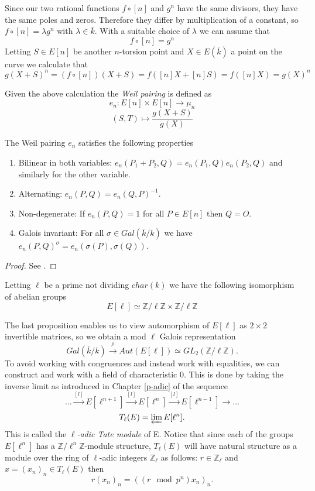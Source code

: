 Since our two rational functions $f \circ [n]$ and $g^n$ have the same divisors, they have the
same poles and zeros. Therefore they differ by multiplication of a constant, so
$f \circ [n] = \lambda g^n$ with $\lambda \in \bar{k}$. With a suitable choice of $\lambda$
we can assume that 
$$f \circ [n] = g^n$$
Letting $S \in E[n]$ be another $n$-torsion point and $X \in E(\bar{k})$ a point on the curve we calculate that
$$ g(X + S)^n = (f \circ [n])(X + S) = f([n]X + [n]S) = f([n]X) = g(X)^n $$
\begin{mydef}
 Given the above calculation the \emph{Weil pairing} is defined as
$$ e_n : E[n] \times E[n] \rightarrow \mu_n$$
$$ (S,T) \mapsto \frac{g(X + S)}{g(X)} $$
\end{mydef}

\begin{prop}
 The Weil pairing $e_n$ satisfies the following properties
\begin{enumerate}
 \item Bilinear in both variables: $e_n(P_1 + P_2, Q) = e_n(P_1,Q)e_n(P_2,Q)$ and similarly for the other variable.
 \item Alternating: $e_n(P,Q) = e_n(Q,P)^{-1}$.
 \item Non-degenerate: If $e_n(P,Q) = 1$ for all $P \in E[n]$ then $Q=O$.
 \item Galois invariant: For all $\sigma \in Gal(\bar{k}/k)$ we have $e_n(P,Q)^\sigma = e_n(\sigma(P),\sigma(Q))$.
\end{enumerate}
\end{prop}
\begin{proof}
 See \cite{AEC}.
\end{proof}

\begin{prop}
Letting $\ell$ be a prime not dividing $char(k)$ we have the following isomorphism of abelian groups
 $$ E[\ell] \simeq \mathbb{Z}/\ell\mathbb{Z} \times \mathbb{Z}/\ell\mathbb{Z} $$
\end{prop}

The last proposition enables us to view automorphism of $E[\ell]$ as $2\times 2$ invertible matrices,
so we obtain a  mod $\ell$ Galois representation
$$ Gal(\bar{k}/k) \overset{\rho}{\rightarrow} Aut(E[\ell]) \simeq GL_2(\mathbb{Z}/\ell\mathbb{Z}). $$
To avoid working with congruences and instead work with equalities, we can construct
and work with a field of characteristic 0. This is done by taking the inverse limit 
as introduced in Chapter \ref{p-adic} of the sequence
$$ \dots \overset{[l]}{\rightarrow} E[\ell^{n+1}] \overset{[l]}{\rightarrow} E[\ell^{n}] \overset{[l]}{\rightarrow} E[\ell^{n-1}] \rightarrow \ldots $$
$$ T_\ell(E) = \varprojlim E[\ell^n]. $$
This is called the \emph{$\ell$-adic Tate module} of E. Notice that since each of the groups $E[\ell^n]$ has a
$\mathbb{Z}/\ell^n\mathbb{Z}$-module structure, $T_\ell(E)$ will have natural structure as a module
over the ring of $\ell$-adic integers $\mathbb{Z}_\ell$ as follows: $r\in\mathbb{Z}_\ell$ and
$x=(x_n)_n\in T_\ell(E)$ then
$$ r(x_n)_n = ((r \mod p^n)x_n)_n.$$

